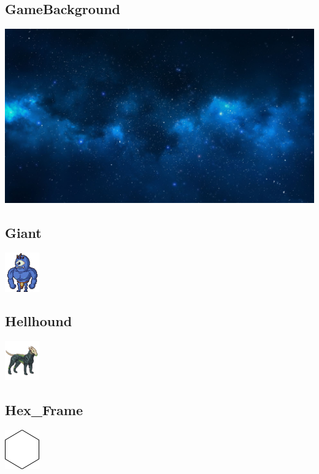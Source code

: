 \documentclass[a4paper,12pt]{scrartcl}
\begin{document}
	\subsection{GameBackground}
	\begin{center}\includegraphics[width=\textwidth
		]{Prog2_EA_V2/Art/GameBackground.jpg}\end{center}
	\subsection{Giant}
	\begin{center}\includegraphics{Prog2_EA_V2/Art/Giant.png}\end{center}
	\subsection{Hellhound}
	\begin{center}\includegraphics{Prog2_EA_V2/Art/Hellhound.png}\end{center}
	\subsection{Hex\_Frame}
	\begin{center}\includegraphics{Prog2_EA_V2/Art/Hex_Frame.png}\end{center}
\end{document}
